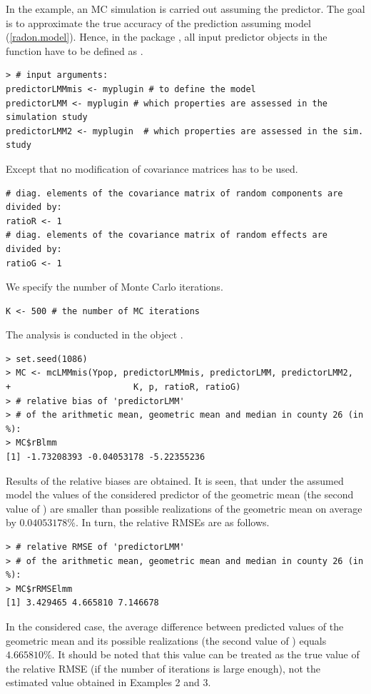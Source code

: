 In the example, an MC simulation is carried out assuming the  predictor. The goal is to  approximate  the true accuracy of the prediction assuming model (\ref{radon.model}). Hence, in the package ,  all input predictor objects in the  function  have to be defined as  .
\
\begin{verbatim}
> # input arguments:
predictorLMMmis <- myplugin # to define the model
predictorLMM <- myplugin # which properties are assessed in the simulation study
predictorLMM2 <- myplugin  # which properties are assessed in the sim. study
\end{verbatim}
Except that no modification of covariance matrices has to be used.
\begin{verbatim}
# diag. elements of the covariance matrix of random components are divided by:
ratioR <- 1
# diag. elements of the covariance matrix of random effects are divided by:
ratioG <- 1
\end{verbatim}
We specify the number of Monte Carlo iterations.
\begin{verbatim}
K <- 500 # the number of MC iterations
\end{verbatim}
The analysis is conducted in the object .

\begin{verbatim}
> set.seed(1086)
> MC <- mcLMMmis(Ypop, predictorLMMmis, predictorLMM, predictorLMM2,
+                        K, p, ratioR, ratioG)
> # relative bias of 'predictorLMM'
> # of the arithmetic mean, geometric mean and median in county 26 (in %):
> MC$rBlmm
[1] -1.73208393 -0.04053178 -5.22355236
\end{verbatim}
Results of the relative biases are obtained. It is seen, that under the assumed model the values of the considered predictor of the geometric mean (the second value of ) are smaller than possible realizations of the geometric mean on average by $0.04053178\%$. In turn, the relative RMSEs are as follows.

\begin{verbatim}
> # relative RMSE of 'predictorLMM'
> # of the arithmetic mean, geometric mean and median in county 26 (in %):
> MC$rRMSElmm
[1] 3.429465 4.665810 7.146678
\end{verbatim}
In the considered case, the average difference between predicted values of the geometric mean and its possible realizations (the second value of ) equals $4.665810\%$. It should be noted that this value can be treated as the true value of the relative RMSE (if the number of iterations is large enough), not the estimated value obtained in Examples 2 and 3.

